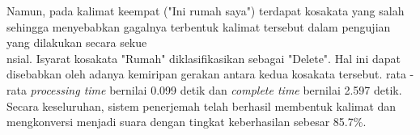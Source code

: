 Namun, pada kalimat keempat ("Ini rumah saya") terdapat kosakata yang salah sehingga menyebabkan gagalnya terbentuk kalimat tersebut dalam pengujian yang dilakukan secara sekue\\nsial. Isyarat kosakata "Rumah" diklasifikasikan sebagai "Delete". Hal ini dapat disebabkan oleh adanya kemiripan gerakan antara kedua kosakata tersebut. rata - rata \emph{processing time} bernilai 0.099 detik dan \emph{complete time} bernilai 2.597 detik. Secara keseluruhan, sistem penerjemah telah berhasil membentuk kalimat dan mengkonversi menjadi suara dengan tingkat keberhasilan sebesar  85.7\%.







